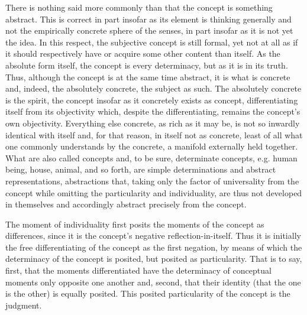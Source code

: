 There is nothing said more commonly
than that the concept is something abstract.
This is correct in part insofar as
its element is thinking generally
and not the empirically concrete sphere of the senses,
in part insofar as it is not yet the idea.
In this respect, the subjective concept is still formal,
yet not at all as if it should respectively have or acquire
some other content than itself.
As the absolute form itself,
the concept is every determinacy,
but as it is in its truth.
Thus, although the concept is
at the same time abstract,
it is what is concrete
and, indeed, the absolutely concrete,
the subject as such.
The absolutely concrete is the spirit,
the concept insofar as it concretely exists as concept,
differentiating itself from its objectivity
which, despite the differentiating,
remains the concept's own objectivity.
Everything else concrete, as rich as it may be,
is not so inwardly identical with itself
and, for that reason, in itself not as concrete,
least of all what one commonly understands
by the concrete, a manifold externally held together.
What are also called concepts
and, to be sure, determinate concepts,
e.g. human being, house, animal, and so forth, are
simple determinations and abstract representations,
abstractions that, taking only the factor of universality
from the concept while omitting
the particularity and individuality,
are thus not developed in themselves
and accordingly abstract precisely from the concept.

The moment of individuality first posits
the moments of the concept as differences,
since it is the concept's negative reflection-in-itself.
Thus it is initially the free differentiating of
the concept as the first negation,
by means of which the determinacy of the concept is posited,
but posited as particularity.
That is to say, first, that the moments differentiated have
the determinacy of conceptual moments only opposite one another
and, second, that their identity
(that the one is the other)
is equally posited.
This posited particularity of
the concept is the judgment.

